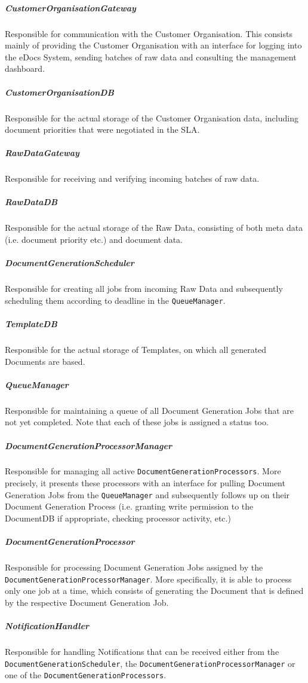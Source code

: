 \documentclass[a4paper,10pt]{article}
\begin{document}
\subparagraph{CustomerOrganisationGateway}
Responsible for communication with the Customer Organisation. This consists mainly of providing the Customer Organisation with an interface for logging into the eDocs System, sending batches of raw data and consulting the management dashboard.

\subparagraph{CustomerOrganisationDB}
Responsible for the actual storage of the Customer Organisation data, including document priorities that were negotiated in the SLA.

\subparagraph{RawDataGateway}
Responsible for receiving and verifying incoming batches of raw data.

\subparagraph{RawDataDB}
Responsible for the actual storage of the Raw Data, consisting of both meta data (i.e. document priority etc.) and document data.

\subparagraph{DocumentGenerationScheduler}
Responsible for creating all jobs from incoming Raw Data and subsequently scheduling them according to deadline in the \texttt{QueueManager}.
 
\subparagraph{TemplateDB}
Responsible for the actual storage of Templates, on which all generated Documents are based.

\subparagraph{QueueManager}
Responsible for maintaining a queue of all Document Generation Jobs that are not yet completed. Note that each of these jobs is assigned a status too.

\subparagraph{DocumentGenerationProcessorManager}
Responsible for managing all active \texttt{DocumentGenerationProcessors}. More precisely, it presents these processors with an interface for pulling Document Generation Jobs from the \texttt{QueueManager} and subsequently follows up on their Document Generation Process (i.e. granting write permission to the DocumentDB if appropriate, checking processor activity, etc.)

\subparagraph{DocumentGenerationProcessor}
Responsible for processing Document Generation Jobs assigned by the \texttt{DocumentGenerationProcessorManager}. More specifically, it is able to process only one job at a time, which consists of generating the Document that is defined by the respective Document Generation Job.

\subparagraph{NotificationHandler}
Responsible for handling Notifications that can be received either from the \texttt{DocumentGenerationScheduler}, the \texttt{DocumentGenerationProcessorManager} or one of the \texttt{DocumentGenerationProcessors}.
\end{document}
